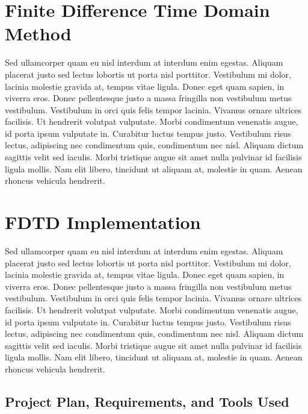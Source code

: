 
\section{Finite Difference Time Domain Method}

Sed ullamcorper quam eu nisl interdum at interdum enim egestas. Aliquam placerat justo sed lectus lobortis ut porta nisl porttitor. Vestibulum mi dolor, lacinia molestie gravida at, tempus vitae ligula. Donec eget quam sapien, in viverra eros. Donec pellentesque justo a massa fringilla non vestibulum metus vestibulum. Vestibulum in orci quis felis tempor lacinia. Vivamus ornare ultrices facilisis. Ut hendrerit volutpat vulputate. Morbi condimentum venenatis augue, id porta ipsum vulputate in. Curabitur luctus tempus justo. Vestibulum risus lectus, adipiscing nec condimentum quis, condimentum nec nisl. Aliquam dictum sagittis velit sed iaculis. Morbi tristique augue sit amet nulla pulvinar id facilisis ligula mollis. Nam elit libero, tincidunt ut aliquam at, molestie in quam. Aenean rhoncus vehicula hendrerit.

\section{FDTD Implementation}

Sed ullamcorper quam eu nisl interdum at interdum enim egestas. Aliquam placerat justo sed lectus lobortis ut porta nisl porttitor. Vestibulum mi dolor, lacinia molestie gravida at, tempus vitae ligula. Donec eget quam sapien, in viverra eros. Donec pellentesque justo a massa fringilla non vestibulum metus vestibulum. Vestibulum in orci quis felis tempor lacinia. Vivamus ornare ultrices facilisis. Ut hendrerit volutpat vulputate. Morbi condimentum venenatis augue, id porta ipsum vulputate in. Curabitur luctus tempus justo. Vestibulum risus lectus, adipiscing nec condimentum quis, condimentum nec nisl. Aliquam dictum sagittis velit sed iaculis. Morbi tristique augue sit amet nulla pulvinar id facilisis ligula mollis. Nam elit libero, tincidunt ut aliquam at, molestie in quam. Aenean rhoncus vehicula hendrerit.

\subsection{Project Plan, Requirements, and Tools Used}

